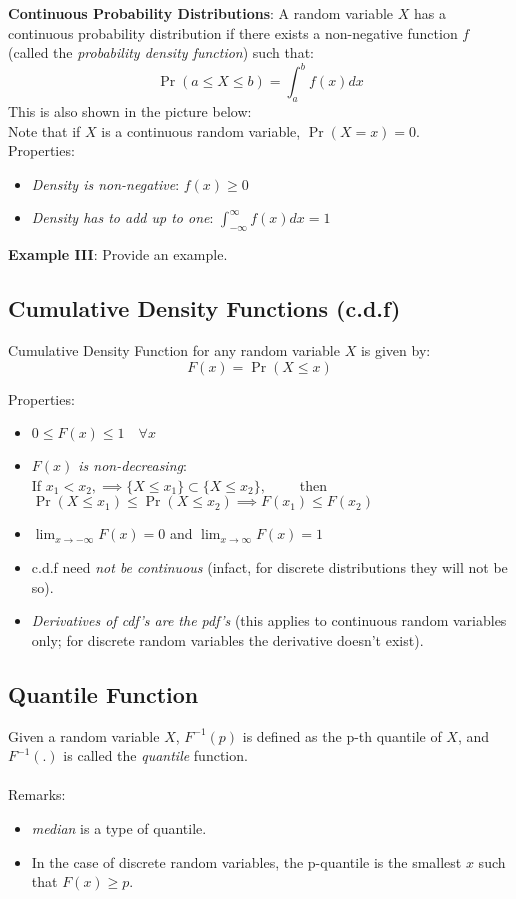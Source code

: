 \documentclass[english, 11pt]{article}
\begin{document}
{\bf Continuous Probability Distributions}: A random variable $X$ has a continuous probability distribution if there exists a non-negative function $f$ (called the {\it probability density function}) such that:
\[ \Pr(a \le X \le b) = \int_a^b f(x) dx \]
This is also shown in the picture below: \\
Note that if $X$ is a continuous random variable, $\Pr(X = x) = 0$.\\

Properties:
\begin{itemize}
\item {\it Density is non-negative}: \hfill $f(x) \ge 0$
\item {\it Density has to add up to one}: \hfill $\int_{-\infty}^{\infty} f(x) dx = 1$ \\
\end{itemize}

{\bf Example III}: Provide an example.

\subsection{Cumulative Density Functions (c.d.f)}
Cumulative Density Function for any random variable $X$ is given by:
\[ F(x) = \Pr(X \le x)\]

Properties:
\begin{itemize}
\item $0 \le F(x) \le 1 \quad \forall x$
\item {\it $F(x)$ is non-decreasing}: \\
If $x_1 < x_2, \implies \{ X \le x_1 \} \subset \{ X \le x_2\}, \quad \quad$ then $\Pr(X \le x_1) \le \Pr(X \le x_2) \implies F(x_1) \le F(x_2)$

\item $\lim_{x \to -\infty} F(x) = 0$ and $\lim_{x \to \infty} F(x) = 1$
\item c.d.f need {\it not be continuous} (infact, for discrete distributions they will not be so).
\item {\it Derivatives of cdf's are the pdf's} (this applies to continuous random variables only; for discrete random variables the derivative doesn't exist).
\end{itemize}

\subsection{Quantile Function}
Given a random variable $X$, $F^{-1}(p)$ is defined as the p-th quantile of $X$, and $F^{-1}(.)$ is called the {\it quantile} function.\\ \\
Remarks:
\begin{itemize}
\item {\it median} is a type of quantile.
\item In the case of discrete random variables, the p-quantile is the smallest $x$ such that $F(x) \ge p$.
\end{itemize}
\end{document}
